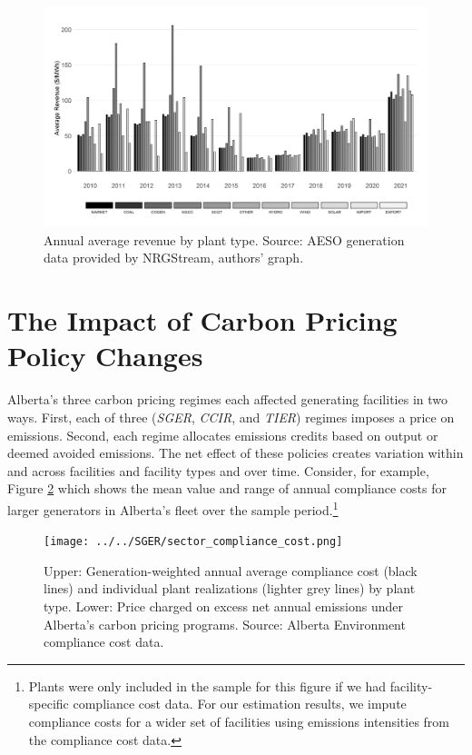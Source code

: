 \documentclass[12pt]{article}
\begin{document}
\begin{figure}[t]%
	\centering \vspace{-.25cm} \includegraphics[width=6.5in]{../images/price_capture.png}
\vspace{-0.75cm}	\caption{Annual average revenue by plant type. Source: AESO generation data provided by NRGStream, authors' graph.}
\label{fig:capture_prices}
\end{figure}


\section{The Impact of Carbon Pricing Policy Changes}

Alberta's three carbon pricing regimes each affected generating facilities in two ways. First, each of three (\emph{SGER}, \emph{CCIR}, and \emph{TIER}) regimes imposes a price on emissions. Second, each regime allocates emissions credits based on output or deemed avoided emissions. The net effect of these policies creates variation within and across facilities and facility types and over time.  Consider, for example, Figure \ref{fig:sector_compliance_cost} which shows the mean value and range of annual compliance costs for larger generators in Alberta's fleet over the sample period.\footnote{Plants were only included in the sample for this figure if we had facility-specific compliance cost data. For our estimation results, we impute compliance costs for a wider set of facilities using emissions intensities from the compliance cost data.}

\begin{figure}[t]%
	\centering \vspace{-.25cm} \texttt{[image: ../../SGER/sector\_compliance\_cost.png]}
\vspace{-0.75cm}	\caption{Upper: Generation-weighted annual average compliance cost (black lines) and individual plant realizations (lighter grey lines) by plant type. Lower: Price charged on excess net annual emissions under Alberta's carbon pricing programs. Source: Alberta Environment compliance cost data.}
\label{fig:sector_compliance_cost}
\end{figure}
\end{document}
